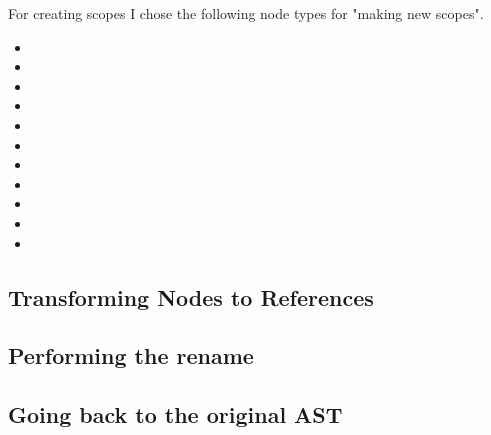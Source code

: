 For creating scopes I chose the following node types for "making new scopes".

\begin{multicols}{2}
\begin{itemize}
    \item {}
    \item {}
    \item {}
    \item {}
    \item {}
    \item {}
    \item {}
    \item {}
    \item {}
    \item {}
    \item {}
\end{itemize}
\end{multicols}

\subsection{Transforming Nodes to References}\label{subsec:transforming-nodes-to-references}

\subsection{Performing the rename}\label{subsec:performing-the-rename}

\subsection{Going back to the original AST}\label{subsec:going-back-to-the-original-ast}